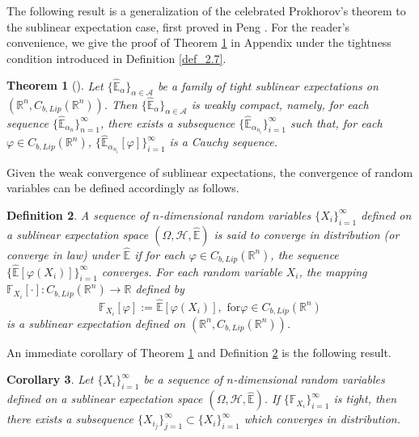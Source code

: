 \documentclass[a4paper,oneside,10pt]{article}%
\newtheorem{theorem}{Theorem}[section]
\newtheorem{corollary}[theorem]{Corollary}
\newtheorem{definition}[theorem]{Definition}
\numberwithin{equation}{section}
\begin{document}
The following result is a generalization of the celebrated Prokhorov's theorem
to the sublinear expectation case, first proved in Peng \cite[Theorem
9]{P2010_CLT}. For the reader's convenience, we give the proof of Theorem
\ref{tight theorem} in Appendix under the tightness condition introduced in
Definition \ref{def_2.7}.

\begin{theorem}
[\cite{P2010_CLT}]\label{tight theorem} Let $\{ \mathbb{\hat{E}}_{\alpha
}\}_{\alpha \in \mathcal{A}}$ be a family of tight sublinear expectations on
$(\mathbb{R}^{n},C_{b,Lip}(\mathbb{R}^{n}))$. Then $\{ \mathbb{\hat{E}%
}_{\alpha}\}_{\alpha \in \mathcal{A}}$ is weakly compact, namely, for each
sequence $\{ \mathbb{\hat{E}}_{\alpha_{n}}\}_{n=1}^{\infty}$, there exists a
subsequence $\{ \mathbb{\hat{E}}_{\alpha_{n_{i}}}\}_{i=1}^{\infty}$ such that,
for each $\varphi \in C_{b,Lip}(\mathbb{R}^{n})$, $\{ \mathbb{\hat{E}}%
_{\alpha_{n_{i}}}[\varphi]\}_{i=1}^{\infty}$ is a Cauchy sequence.
\end{theorem}

Given the weak convergence of sublinear expectations, the convergence of
random variables can be defined accordingly as follows.

\begin{definition}
\label{converge in distribution}A sequence of $n$-dimensional random variables
$\{X_{i}\}_{i=1}^{\infty}$ defined on a sublinear expectation space
$(\Omega,\mathcal{H},\mathbb{\hat{E}})$ is said to converge in distribution
(or converge in law) under $\mathbb{\hat{E}}$ if for each $\varphi \in
C_{b,Lip}(\mathbb{R}^{n})$, the sequence $\{ \mathbb{\hat{E} }[\varphi
(X_{i})]\}_{i=1}^{\infty}$ converges. For each random variable $X_{i}$, the
mapping $\mathbb{F}_{X_{i}}[\cdot]:C_{b,Lip}(\mathbb{R} ^{n})\rightarrow
\mathbb{R}$ defined by
\[
\mathbb{F}_{X_{i}}[\varphi]:=\mathbb{\hat{E}}[\varphi(X_{i})],\text{ for
}\varphi \in C_{b,Lip}(\mathbb{R}^{n})
\]
is a sublinear expectation defined on $(\mathbb{R}^{n},C_{b,Lip}%
(\mathbb{R}^{n}))$.
\end{definition}

An immediate corollary of Theorem \ref{tight theorem} and Definition
\ref{converge in distribution} is the following result.

\begin{corollary}
\label{corollary tight theorem} Let $\{X_{i}\}_{i=1}^{\infty}$ be a sequence
of $n$-dimensional random variables defined on a sublinear expectation space
$(\Omega,\mathcal{H},\mathbb{\hat{E}})$. If $\{ \mathbb{F}_{X_{i}}%
\}_{i=1}^{\infty}$ is tight, then there exists a subsequence $\{X_{i_{j}%
}\}_{j=1}^{\infty}\subset \{X_{i}\}_{i=1}^{\infty}$ which converges in distribution.
\end{corollary}
\end{document}
